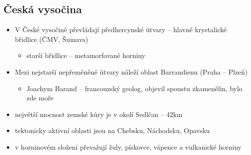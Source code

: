 \subsection{Česká vysočina}
\begin{itemize}
\item V České vysočině převládají předhercynské útvary -- hlavně krystalické břidlice (ČMV, Šumava)
	\begin{itemize}
	\item starší břidlice -- metamorfované horniny
	\end{itemize}
\item Mezi nejstarší nepřeměněné útvary náleží oblast Barrandienu (Praha -- Plzeň)
	\begin{itemize}
	\item Joachym Barand -- francouzský geolog, objevil spoustu zkamenělin, bylo zde moře
	\end{itemize}
	\item největší mocnost zemské kůry je v okolí Sedlčan -- 42km
	\item tektonicky aktivní oblasti jsou na Chebsku, Náchodsku, Opavsku
	\item v horninovém složení převažují žuly, pískovce, vápence a vulkanické horniny
\end{itemize}

